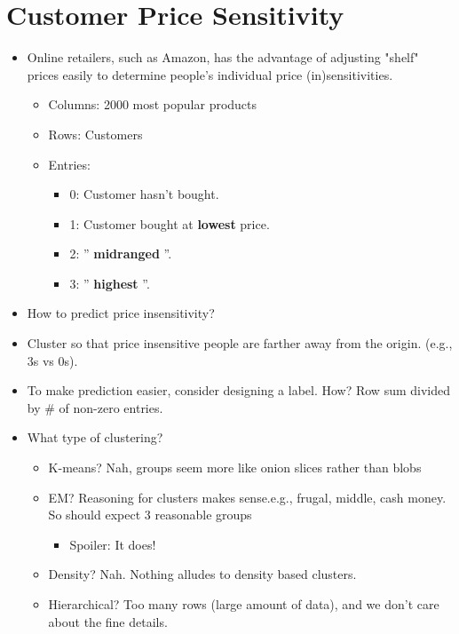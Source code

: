 \newpage
{}

\section*{Customer Price Sensitivity}
\begin{itemize}
  \item Online retailers, such as Amazon, has the advantage of adjusting "shelf" prices easily to determine people's individual price (in)sensitivities.
        \begin{itemize}
          \item Columns: 2000 most popular products
          \item Rows: Customers
          \item Entries:
                \begin{itemize}
                  \item 0: Customer hasn't bought.
                  \item 1: Customer bought at \textbf{lowest} price.
                  \item 2: '' \textbf{midranged} ''.
                  \item 3: '' \textbf{highest} ''.
                \end{itemize}
        \end{itemize}
  \item How to predict price insensitivity?
  \item Cluster so that price insensitive people are farther away from the origin. (e.g., 3s vs 0s).
  \item To make prediction easier, consider designing a label. How? Row sum divided by \# of non-zero entries.
  \item What type of clustering?
        \begin{itemize}
          \item K-means? Nah, groups seem more like onion slices rather than blobs
          \item EM? Reasoning for clusters makes sense.\@ e.g., frugal, middle, cash money. So should expect 3 reasonable groups
                \begin{itemize}
                  \item Spoiler: It does!
                \end{itemize}
          \item Density? Nah. Nothing alludes to density based clusters.
          \item Hierarchical? Too many rows (large amount of data), and we don't care about the fine details.

\end{itemize}
\end{itemize}
